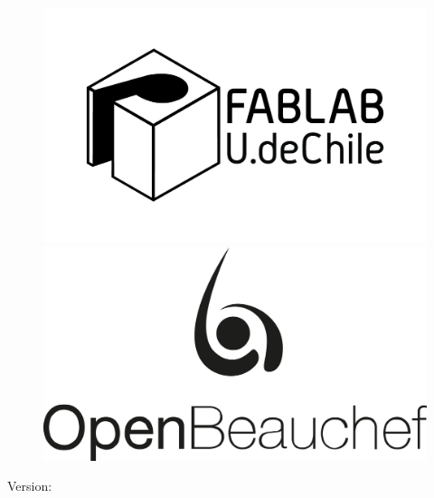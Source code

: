\begin{titlepage}
\begin{figure}[h!]
\begin{minipage}{.24\textwidth}
      \includegraphics[width=\linewidth]{./images/logos/fablab.jpg}
    \end{minipage}
    \begin{minipage}{.24\textwidth}
      \centering
      \includegraphics[width=\linewidth]{./images/logos/ob.png}
    \end{minipage}
  \end{figure}

  
  \vfill\vfill\vfill %
  
  
  {\large Version: \the\year} %
  
  
   
  
  \vfill %
  
\end{titlepage}

